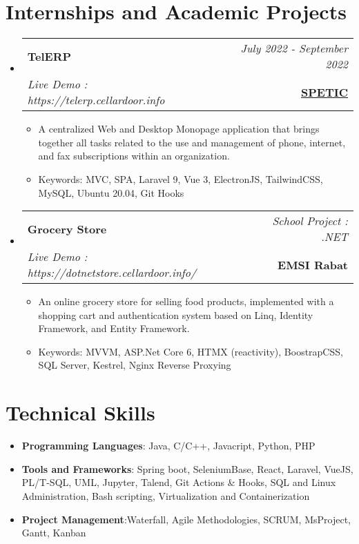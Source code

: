 \documentclass[a4paper,11pt]{article}
\makeatletter
\newcommand{\resumeItem}[2]{
  \item{
    \textbf{#1}{:\hspace{0.5mm}#2 \vspace{-0.5mm}}
  }
}
\newcommand{\resumeProject}[4]{
\vspace{0.5mm}\item
    \begin{tabular*}{0.98\textwidth}[t]{l@{\extracolsep{\fill}}r}
        \textbf{#1} & \textit{\footnotesize{#3}} \\
        \footnotesize{\textit{#2}} & \footnotesize{#4}
    \end{tabular*}
    \vspace{-2.4mm}
}
\newcommand{\resumeSubItem}[2]{\resumeItem{#1}{#2}\vspace{-4pt}}
\newcommand{\resumeSubHeadingListStart}{\begin{itemize}[leftmargin=*,labelsep=0mm]}
\newcommand{\resumeHeadingSkillStart}{\begin{itemize}[leftmargin=*,itemsep=1.7mm, rightmargin=2ex]}
\newcommand{\resumeItemListStart}{\begin{justify}\begin{itemize}[leftmargin=3ex, rightmargin=2ex, noitemsep,labelsep=1.2mm,itemsep=0mm]\small}
\newcommand{\resumeSubHeadingListEnd}{\end{itemize}\vspace{2mm}}
\newcommand{\resumeHeadingSkillEnd}{\end{itemize}\vspace{-2mm}}
\newcommand{\resumeItemListEnd}{\end{itemize}\end{justify}\vspace{-2mm}}
\makeatother
\begin{document}
\section{\textbf{Internships and Academic Projects}}
\resumeSubHeadingListStart 
    \resumeProject
      {TelERP} 
      {Live Demo : https://telerp.cellardoor.info} 
      {July 2022 - September 2022} 
      {\href{https://telerp.cellardoor.info}{\textbf{SPETIC}}} 
        \vspace{-2mm}
      \resumeItemListStart
        \item {A centralized Web and Desktop Monopage application that brings together all tasks related to the use and management of phone, internet, and fax subscriptions within an organization.}
        \item {Keywords: MVC, SPA, Laravel 9, Vue 3, ElectronJS, TailwindCSS, MySQL, Ubuntu 20.04, Git Hooks}
      \resumeItemListEnd
      \vspace{-3mm}
    \resumeProject
      {Grocery Store} 
    {Live Demo : https://dotnetstore.cellardoor.info/} 
      {School Project : .NET} 
      {{\textbf{EMSI Rabat}}} 
    \vspace{-2mm}
      \resumeItemListStart
        \item {An online grocery store for selling food products, implemented with a shopping cart and authentication system based on Linq, Identity Framework, and Entity Framework.}
        \item {Keywords: MVVM, ASP.Net Core 6, HTMX (reactivity), BoostrapCSS, SQL Server, Kestrel, Nginx Reverse Proxying}
      \resumeItemListEnd
     \vspace{-2mm}
\resumeSubHeadingListEnd
\vspace{-7mm}

\section{\textbf{Technical Skills}}
 \resumeHeadingSkillStart
  \resumeSubItem{Programming Languages} 
    { Java, C/C++, Javacript, Python, PHP}
    \vspace{-0.5mm} 
 \resumeSubItem{Tools and Frameworks} 
    { Spring boot, SeleniumBase, React, Laravel, VueJS, PL/T-SQL, UML, Jupyter, Talend, Git Actions \& Hooks, SQL and Linux Administration, Bash scripting, Virtualization and Containerization} 
    \vspace{-0.5mm}
\resumeSubItem{Project Management} 
    {Waterfall, Agile Methodologies, SCRUM,  MsProject, Gantt, Kanban} 
    \vspace{-0.5mm} 
 \resumeHeadingSkillEnd
\vspace{-2mm}
\end{document}
